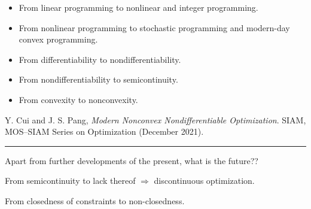 \documentclass[aspectratio=169,11pt]{beamer}
\begin{document}
\begin{frame}[plain,t]
  \vspace{0.02cm}
  {\color{decknavy}\par}

  \vspace{0.04cm}
  \begin{itemize}
    \setlength{\itemsep}{0.035cm}
    \setlength{\parskip}{0pt}
    \fontsize{13.0}{15.2}\selectfont
    \item From linear programming to nonlinear and integer programming.
    \item From nonlinear programming to stochastic programming and modern-day convex programming.
    \item From differentiability to nondifferentiability.
    \item From nondifferentiability to semicontinuity.
    \item From convexity to nonconvexity.
  \end{itemize}

  \vspace{-0.02cm}
  {\color{deckblue}\fontsize{10.8}{13.1}\selectfont
    Y. Cui and J. S. Pang, \textit{Modern Nonconvex Nondifferentiable
    Optimization}. SIAM, MOS--SIAM Series on Optimization
    (December 2021).\par}

  \vspace{0.10cm}
  {\color{decknavy}\rule{0.48\textwidth}{0.45pt}\par}
  \vspace{0.08cm}

  {\color{deckblue}\fontsize{12.0}{14.4}\selectfont
    Apart from further developments of the present, what is the future??\par}
  \vspace{0.06cm}
  {\color{decknavy}\fontsize{11.5}{13.8}\selectfont
    From semicontinuity to lack thereof $\Rightarrow$ discontinuous optimization.\par
    \vspace{0.08cm}
    From closedness of constraints to non-closedness.\par}
\end{frame}
\end{document}
